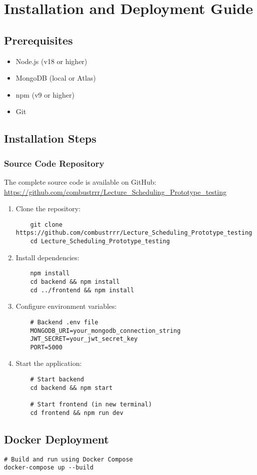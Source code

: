 \chapter{Installation and Deployment Guide}

\section{Prerequisites}
\begin{itemize}[leftmargin=*]
    \item Node.js (v18 or higher)
    \item MongoDB (local or Atlas)
    \item npm (v9 or higher)
    \item Git
\end{itemize}

\section{Installation Steps}
\subsection*{Source Code Repository}
The complete source code is available on GitHub:
\\\url{https://github.com/combustrrr/Lecture_Scheduling_Prototype_testing}

\begin{enumerate}
    \item Clone the repository:
    \begin{verbatim}
    git clone https://github.com/combustrrr/Lecture_Scheduling_Prototype_testing
    cd Lecture_Scheduling_Prototype_testing
    \end{verbatim}
    
    \item Install dependencies:
    \begin{verbatim}
    npm install
    cd backend && npm install
    cd ../frontend && npm install
    \end{verbatim}
    
    \item Configure environment variables:
    \begin{verbatim}
    # Backend .env file
    MONGODB_URI=your_mongodb_connection_string
    JWT_SECRET=your_jwt_secret_key
    PORT=5000
    \end{verbatim}
    
    \item Start the application:
    \begin{verbatim}
    # Start backend
    cd backend && npm start
    
    # Start frontend (in new terminal)
    cd frontend && npm run dev
    \end{verbatim}
\end{enumerate}

\section{Docker Deployment}
\begin{verbatim}
# Build and run using Docker Compose
docker-compose up --build
\end{verbatim}
